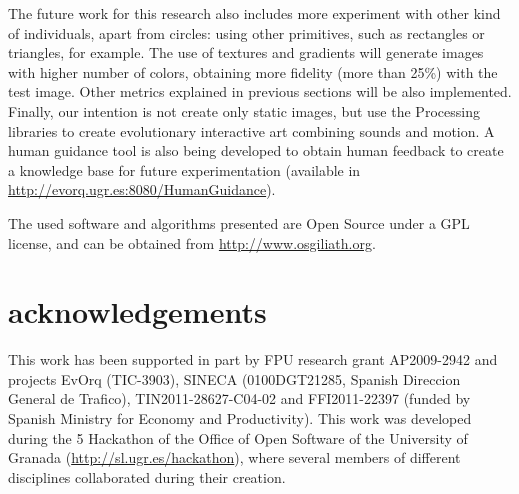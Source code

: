 \documentclass[conference]{IEEEtran}
\begin{document}
The future work for this research also includes more experiment with other kind of individuals, apart from circles: using other primitives, such as rectangles or triangles, for example. The use of textures and gradients will generate images with higher number of colors, obtaining more fidelity (more than 25\%) with the test image. Other metrics explained in previous sections will be also implemented. Finally, our intention is not create only static images, but use the Processing libraries to create evolutionary interactive art combining sounds and motion. A human guidance tool is also being developed to obtain human feedback to create a knowledge base for future experimentation (available in \url{http://evorq.ugr.es:8080/HumanGuidance}).

The used software and algorithms presented are Open Source under a GPL license, and can be obtained from \url{http://www.osgiliath.org}.

\section*{acknowledgements}
This work has been supported in part by FPU research grant AP2009-2942 and projects EvOrq (TIC-3903), SINECA (0100DGT21285, Spanish Direccion General de Trafico), TIN2011-28627-C04-02 and FFI2011-22397 (funded by Spanish Ministry for Economy and Productivity). This work was developed during the 5 Hackathon of the Office of Open Software of the University of Granada (\url{http://sl.ugr.es/hackathon}), where several members of different disciplines collaborated during their creation.



\end{document}
